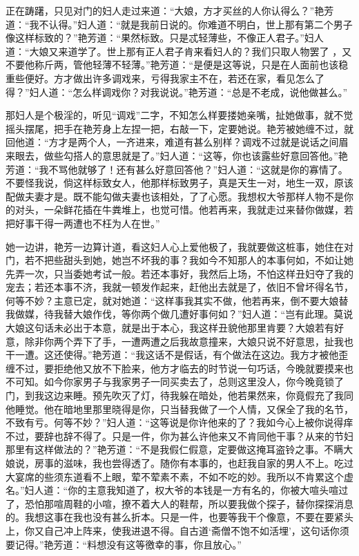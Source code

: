 \documentclass[a4paper,12pt,UTF8,twoside]{ctexbook}
\begin{document}
正在踌躇，只见对门的妇人走过来道：“大娘，方才买丝的人你认得么？”艳芳道：“我不认得。”妇人道：“就是我前日说的。你难道不明白，世上那有第二个男子像这样标致的？”艳芳道：“果然标致。只是忒轻薄些，不像正人君子。”妇人道：“大娘又来道学了。世上那有正人君子肯来看妇人的？我们只取人物罢了 ，又不要他称斤两，管他轻薄不轻薄。”艳芳道：“是便是这等说，只是在人面前也该稳重些便好。方才做出许多调戏来，亏得我家主不在，若还在家，看见怎么了得？”妇人道：“怎么样调戏你？对我说说。”艳芳道：“总是不老成，说他做甚么。”

那妇人是个极淫的，听见“调戏”二字，不知怎么样要搂她亲嘴，扯她做事，就不觉摇头摆尾，把手在艳芳身上左捏一把，右敲一下，定要她说。艳芳被她缠不过，就回他道：“方才是两个人，一齐进来，难道有甚么别样？调戏不过就是说话之间眉来眼去，做些勾搭人的意思就是了。”妇人道：“这等，你也该露些好意回答他。”艳芳道：“我不骂他就够了！还有甚么好意回答他？”妇人道：“这就是你的寡情了。不要怪我说，倘这样标致女人，他那样标致男子，真是天生一对，地生一双，原该配做夫妻才是。既不能勾做夫妻也该相处，了了心愿。我想权大爷那样人物不是你的对头，一朵鲜花插在牛粪堆上，也觉可惜。他若再来，我就走过来替你做媒，若把好事干得一两遭也不枉为人在世。”

她一边讲，艳芳一边算计道，看这妇人心上爱他极了，我就要做这桩事，她住在对门，若不把些甜头到她，她岂不坏我的事？我如今不知那人的本事何如，不如让她先弄一次，只当委她考试一般。若还本事好，我然后上场，不怕这样丑妇夺了我的宠去；若还本事不济，我就一顿发作起来，赶他出去就是了，依旧不曾坏得名节，何等不妙？主意已定，就对她道：“这样事我其实不做，他若再来，倒不要大娘替我做媒，待我替大娘作伐，等你两个做几遭好事何如？”妇人道：“岂有此理。莫说大娘这句话未必出于本意，就是出于本心，我这样丑貌他那里肯要？大娘若有好意，除非你两个弄下了手，一遭两遭之后我故意撞来，大娘只说不好意思，扯我也干一遭。这还使得。”艳芳道：“我这话不是假话，有个做法在这边。我方才被他歪缠不过，要拒绝他又放不下脸来，他方才临去的时节说一句巧话，今晚就要摸来也不可知。如今你家男子与我家男子一同买卖去了，总则这里没人，你今晚竟锁了门，到我这边来睡。预先吹灭了灯，待我躲在暗处，他若果然来，你竟假充了我同他睡觉。他在暗地里那里晓得是你，只当替我做了一个人情，又保全了我的名节，不致有亏。何等不妙？”妇人道：“这等说是你许他来的了？我如今心上被你说得痒不过，要辞也辞不得了。只是一件，你为甚么许他来又不肯同他干事？从来的节妇那里有这样做法的？”艳芳道：“不是我假仁假意，定要做这掩耳盗铃之事。不瞒大娘说，房事的滋味，我也尝得透了。随你有本事的，也赶我自家的男人不上。吃过大宴席的些须东道看不上眼，荤不荤素不素，不如不吃的妙。我所以不肯累这个虚名。”妇人道：“你的主意我知道了，权大爷的本钱是一方有名的，你被大喧头喧过了，恐怕那喧周鞋的小喧，撩不着大人的鞋帮，所以要我做个探子，替你探探消息的。我想这事在我也没有甚么折本。只是一件，也要等我干个像意，不要在要紧头上，你又自己冲上阵来，使我进退不得。自古道‘斋僧不饱不如活埋’，这句话你须要记得。”艳芳道：“料想没有这等徼幸的事，你且放心。”
\end{document}
